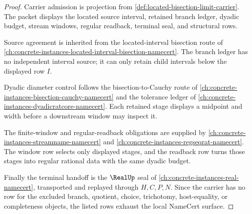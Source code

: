 \begin{proof}
Carrier admission is projection from \autoref{def:located-bisection-limit-carrier}. The packet displays the located source interval, retained branch ledger, dyadic budget, stream windows, regular readback, terminal seal, and structural rows.

Source agreement is inherited from the located-interval bisection route of \autoref{ch:concrete-instances-located-interval-bisection-namecert}. The branch ledger has no independent interval source; it can only retain child intervals below the displayed row $I$.

Dyadic diameter control follows the bisection-to-Cauchy route of \autoref{ch:concrete-instances-bisection-cauchy-namecert} and the tolerance ledger of \autoref{ch:concrete-instances-dyadicratcore-namecert}. Each retained stage displays a midpoint and width before a downstream window may inspect it.

The finite-window and regular-readback obligations are supplied by \autoref{ch:concrete-instances-streamname-namecert} and \autoref{ch:concrete-instances-regseqrat-namecert}. The window row selects only displayed stages, and the readback row turns those stages into regular rational data with the same dyadic budget.

Finally the terminal handoff is the $\RealUp$ seal of \autoref{ch:concrete-instances-real-namecert}, transported and replayed through $H,C,P,N$. Since the carrier has no row for the excluded branch, quotient, choice, trichotomy, host-equality, or completeness objects, the listed rows exhaust the local NameCert surface.
\end{proof}

